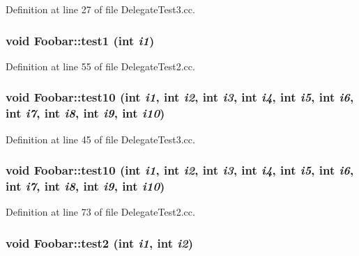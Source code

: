 Definition at line 27 of file Delegate\-Test3.cc.\hypertarget{structFoobar_a1}{
\subsubsection[test1]{\setlength{\rightskip}{0pt plus 5cm}void Foobar::test1 (int {\em i1})}}
\label{structFoobar_a1}




Definition at line 55 of file Delegate\-Test2.cc.\hypertarget{structFoobar_a21}{
\subsubsection[test10]{\setlength{\rightskip}{0pt plus 5cm}void Foobar::test10 (int {\em i1}, int {\em i2}, int {\em i3}, int {\em i4}, int {\em i5}, int {\em i6}, int {\em i7}, int {\em i8}, int {\em i9}, int {\em i10})}}
\label{structFoobar_a21}




Definition at line 45 of file Delegate\-Test3.cc.\hypertarget{structFoobar_a10}{
\subsubsection[test10]{\setlength{\rightskip}{0pt plus 5cm}void Foobar::test10 (int {\em i1}, int {\em i2}, int {\em i3}, int {\em i4}, int {\em i5}, int {\em i6}, int {\em i7}, int {\em i8}, int {\em i9}, int {\em i10})}}
\label{structFoobar_a10}




Definition at line 73 of file Delegate\-Test2.cc.\hypertarget{structFoobar_a13}{
\subsubsection[test2]{\setlength{\rightskip}{0pt plus 5cm}void Foobar::test2 (int {\em i1}, int {\em i2})}}
\label{structFoobar_a13}




